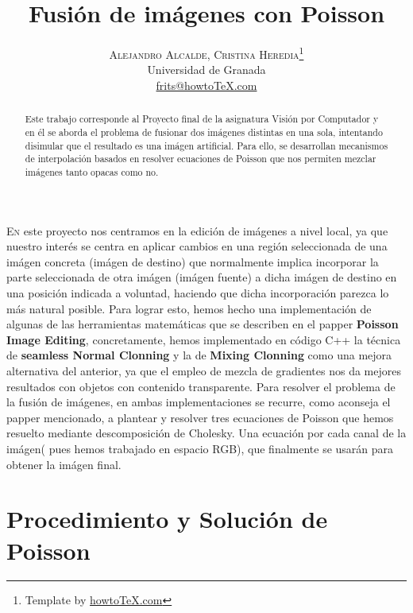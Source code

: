 \documentclass[oneside]{article}
\title{\vspace{-15mm}%
	\fontsize{24pt}{10pt}\selectfont
	\textbf{Fusión de imágenes con Poisson}
	}
\author{%
	\large
	\textsc{Alejandro Alcalde, Cristina Heredia}\thanks{Template by \href{http://www.howtotex.com}{howtoTeX.com}} \\[2mm]
	\normalsize	Universidad de Granada \\
	\normalsize	\href{mailto:frits@howtoTeX.com}{frits@howtoTeX.com}
	\vspace{-5mm}
	}
\date{}
\begin{document}
\maketitle
\thispagestyle{fancy}

\begin{abstract}
\noindent Este trabajo corresponde al Proyecto final de la asignatura Visión por Computador y en él se aborda el problema de fusionar dos imágenes
distintas en una sola, intentando disimular que el resultado es una imágen artificial. Para ello, se desarrollan mecanismos de interpolación
basados en resolver ecuaciones de Poisson que nos permiten mezclar imágenes tanto opacas como no.
\end{abstract}


\begin{multicols}{2}

\lettrine[nindent=0em,lines=3]{E}n este proyecto nos centramos en la edición de imágenes a nivel local, ya que nuestro interés se centra en aplicar
cambios en una región seleccionada de una imágen concreta (imágen de destino) que normalmente implica incorporar la parte seleccionada de otra imágen
(imágen fuente)  a dicha imágen de destino en una posición indicada a voluntad, haciendo que dicha incorporación parezca lo más natural posible. \newline \newline Para lograr esto, hemos hecho una implementación
de algunas de las herramientas matemáticas que se describen en el papper \textbf{Poisson Image Editing}, concretamente, hemos implementado en código C++ la técnica de  \textbf{seamless Normal Clonning} y la de \textbf{Mixing Clonning} como una mejora alternativa
del anterior, ya que el empleo de mezcla de gradientes nos da mejores resultados con objetos con contenido transparente. \newline Para resolver el problema de la fusión de imágenes, en ambas implementaciones
se recurre, como aconseja el papper mencionado, a plantear y resolver tres ecuaciones de Poisson que hemos resuelto mediante descomposición de Cholesky. Una ecuación por cada canal de la imágen( pues hemos trabajado en espacio RGB), que finalmente se usarán
para obtener la imágen final. \newline

\section{Procedimiento y Solución de Poisson}


\end{multicols}
\end{document}
